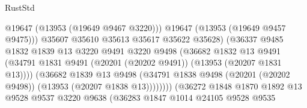 \begin{lexlean}{RustStd}
\begin{coremodule}
                                              @19647
                                              (@13953 (@19649 @9467 @3220)))
                                            @19647
                                            (@13953 (@19649 @9457 @9475)))
                                          @35607
                                          @35610
                                          @35613
                                          @35617
                                          @35622
                                          @35628)
                                        (@36337
                                          @9485
                                          @1832
                                          @1839
                                          @13
                                          @3220
                                          @9491
                                          @3220
                                          @9498
                                          (@36682
                                            @1832
                                            @13
                                            @9491
                                            (@34791
                                              @1831
                                              @9491
                                              (@20201 (@20202 @9491))
                                              (@13953 (@20207 @1831 @13))))
                                          (@36682
                                            @1839
                                            @13
                                            @9498
                                            (@34791
                                              @1838
                                              @9498
                                              (@20201 (@20202 @9498))
                                              (@13953 (@20207 @1838 @13))))))))
                                  (@36272
                                    @1848
                                    @1870
                                    @1892
                                    @13
                                    @9528
                                    @9537
                                    @3220
                                    @9638
                                    (@36283
                                      @1847
                                      @1014
                                      @24105
                                      @9528
                                      @9535

\end{coremodule}
\end{lexlean}
